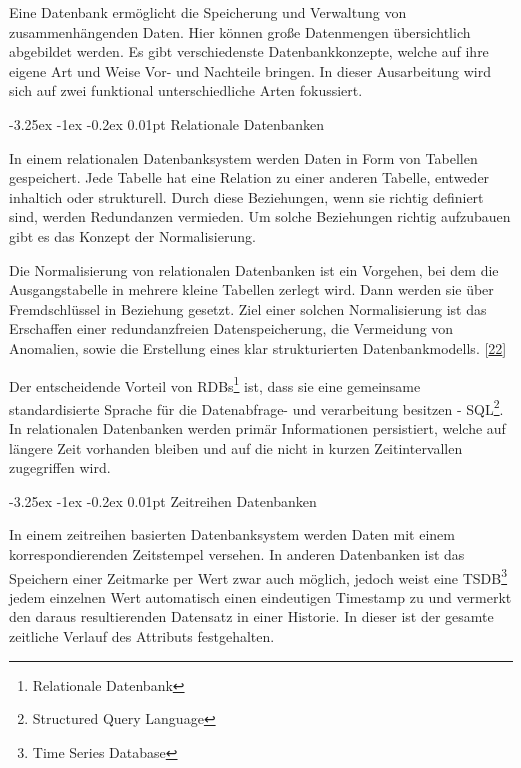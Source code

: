 \documentclass[
    headings=optiontotocandhead,%
    twoside,
    numbers=noenddot,%
    12pt, %
    titlepage, %
    parskip=full, %
    listof=leveldown, 
    numbers=noenddot, %
    a4paper,DIV=14,
    BCOR=15mm,
]{scrbook}
\makeatletter
\renewenvironment{quote}{\begin{customblockquote}\list{}{\rightmargin=0em\leftmargin=0em}%
\item\relax\color{blockquote-text}\ignorespaces}{\unskip\unskip\endlist\end{customblockquote}}
\renewcommand\paragraph{\@startsection{paragraph}{4}{\z@}%
    {-3.25ex \@plus -1ex \@minus -0.2ex}%
    {0.01pt}%
    {\raggedsection\normalfont\sectfont\nobreak\size@paragraph}%
  }
\makeatother
\begin{document}
Eine Datenbank ermöglicht die Speicherung und Verwaltung von
zusammenhängenden Daten. Hier können große Datenmengen übersichtlich
abgebildet werden. Es gibt verschiedenste Datenbankkonzepte, welche auf
ihre eigene Art und Weise Vor- und Nachteile bringen. In dieser
Ausarbeitung wird sich auf zwei funktional unterschiedliche Arten
fokussiert.

\hypertarget{relationale-datenbanken}{%
\paragraph{Relationale Datenbanken}\label{relationale-datenbanken}}

In einem relationalen Datenbanksystem werden Daten in Form von Tabellen
gespeichert. Jede Tabelle hat eine Relation zu einer anderen Tabelle,
entweder inhaltich oder strukturell. Durch diese Beziehungen, wenn sie
richtig definiert sind, werden Redundanzen vermieden. Um solche
Beziehungen richtig aufzubauen gibt es das Konzept der Normalisierung.

\begin{quote}
Die Normalisierung von relationalen Datenbanken ist ein Vorgehen, bei
dem die Ausgangstabelle in mehrere kleine Tabellen zerlegt wird. Dann
werden sie über Fremdschlüssel in Beziehung gesetzt. Ziel einer solchen
Normalisierung ist das Erschaffen einer redundanzfreien
Datenspeicherung, die Vermeidung von Anomalien, sowie die Erstellung
eines klar strukturierten Datenbankmodells.
{[}\protect\hyperlink{ref-Nachhilfe-Team}{22}{]}
\end{quote}

Der entscheidende Vorteil von RDBs\footnote{Relationale Datenbank} ist,
dass sie eine gemeinsame standardisierte Sprache für die Datenabfrage-
und verarbeitung besitzen - SQL\footnote{Structured Query Language}. In
relationalen Datenbanken werden primär Informationen persistiert, welche
auf längere Zeit vorhanden bleiben und auf die nicht in kurzen
Zeitintervallen zugegriffen wird.

\hypertarget{zeitreihen-datenbanken}{%
\paragraph{Zeitreihen Datenbanken}\label{zeitreihen-datenbanken}}

In einem zeitreihen basierten Datenbanksystem werden Daten mit einem
korrespondierenden Zeitstempel versehen. In anderen Datenbanken ist das
Speichern einer Zeitmarke per Wert zwar auch möglich, jedoch weist eine
TSDB\footnote{Time Series Database} jedem einzelnen Wert automatisch
einen eindeutigen Timestamp zu und vermerkt den daraus resultierenden
Datensatz in einer Historie. In dieser ist der gesamte zeitliche Verlauf
des Attributs festgehalten.
\end{document}
